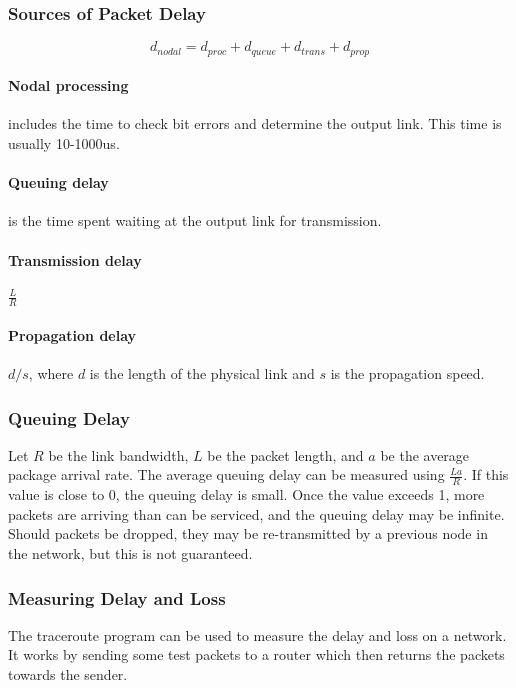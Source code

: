 \documentclass[12pt,titlepage]{article}
\begin{document}
      \subsubsection{Sources of Packet Delay}
        $$d_{nodal} = d_{proc} + d_{queue} + d_{trans} + d_{prop}$$
      
        \paragraph{Nodal processing} includes the time to check bit errors and determine the output link. This time is usually 10-1000us.

        \paragraph{Queuing delay} is the time spent waiting at the output link for transmission.

        \paragraph{Transmission delay} $\frac{L}{R}$

        \paragraph{Propagation delay} $d/s$, where $d$ is the length of the physical link and $s$ is the propagation speed.

      \subsubsection{Queuing Delay}
        Let $R$ be the link bandwidth, $L$ be the packet length, and $a$ be the average package arrival rate. The average queuing delay
        can be measured using $\frac{La}{R}$. If this value is close to 0, the queuing delay is small. Once the value exceeds 1, more
        packets are arriving than can be serviced, and the queuing delay may be infinite. Should packets be dropped, they may be
        re-transmitted by a previous node in the network, but this is not guaranteed.

      \subsubsection{Measuring Delay and Loss}
        The traceroute program can be used to measure the delay and loss on a network. It works by sending some test packets to a router which
        then returns the packets towards the sender.
\end{document}
